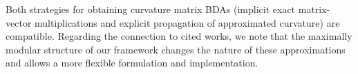 Both strategies for obtaining curvature matrix BDAs (implicit exact
matrix-vector multiplications and explicit propagation of approximated
curvature) are compatible. Regarding the connection to cited works, we note that
the maximally modular structure of our framework changes the nature of these
approximations and allows a more flexible formulation and
implementation.

